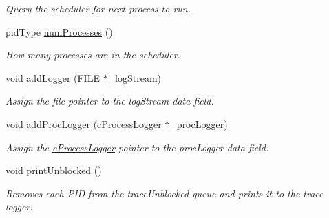 \begin{DoxyCompactItemize}
\begin{DoxyCompactList}\small\item\em \-Query the scheduler for next process to run. \end{DoxyCompactList}\item 
pid\-Type \hyperlink{classcLottery_a4f77d186c1f4cbb82d3fff077bba7736}{num\-Processes} ()
\begin{DoxyCompactList}\small\item\em \-How many processes are in the scheduler. \end{DoxyCompactList}\item 
\hypertarget{classcLottery_ad9b5803ea8dabd0df69d8063173b95a5}{void \hyperlink{classcLottery_ad9b5803ea8dabd0df69d8063173b95a5}{add\-Logger} (\-F\-I\-L\-E $\ast$\-\_\-log\-Stream)}\label{dd/dc8/classcLottery_ad9b5803ea8dabd0df69d8063173b95a5}

\begin{DoxyCompactList}\small\item\em \-Assign the file pointer to the log\-Stream data field. \end{DoxyCompactList}\item 
\hypertarget{classcLottery_a3181bce7c9e3464215fdd9c328851787}{void \hyperlink{classcLottery_a3181bce7c9e3464215fdd9c328851787}{add\-Proc\-Logger} (\hyperlink{classcProcessLogger}{c\-Process\-Logger} $\ast$\-\_\-proc\-Logger)}\label{dd/dc8/classcLottery_a3181bce7c9e3464215fdd9c328851787}

\begin{DoxyCompactList}\small\item\em \-Assign the \hyperlink{classcProcessLogger}{c\-Process\-Logger} pointer to the proc\-Logger data field. \end{DoxyCompactList}\item 
\hypertarget{classcLottery_ab878165e4106b7e09cfa1fbc87d33d1b}{void \hyperlink{classcLottery_ab878165e4106b7e09cfa1fbc87d33d1b}{print\-Unblocked} ()}\label{dd/dc8/classcLottery_ab878165e4106b7e09cfa1fbc87d33d1b}

\begin{DoxyCompactList}\small\item\em \-Removes each \-P\-I\-D from the trace\-Unblocked queue and prints it to the trace logger. \end{DoxyCompactList}\end{DoxyCompactItemize}
